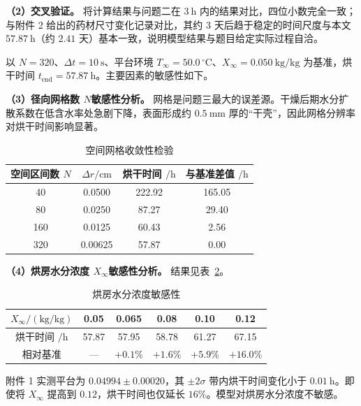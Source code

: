 \documentclass[12pt,a4paper]{article}
\begin{document}
\textbf{（2）交叉验证。} 将计算结果与问题二在 \(3\ \mathrm{h}\) 内的结果对比，四位小数完全一致；与附件 2 给出的药材尺寸变化记录对比，其约 \(3\) 天后趋于稳定的时间尺度与本文 \(57.87\ \mathrm{h}\)（约 \(2.41\) 天）基本一致，说明模型结果与题目给定实际过程自洽。


以 \(N=320\)、\(\Delta t=10\ \mathrm{s}\)、平台环境 \(T_\infty=50.0\,^\circ\mathrm{C}\)、\(X_\infty=0.050\ \mathrm{kg/kg}\) 为基准，烘干时间 \(t_{\mathrm{end}}=57.87\ \mathrm{h}\)。主要因素的敏感性如下。

\textbf{（3）径向网格数 \(N\)敏感性分析。} 网格是问题三最大的误差源。干燥后期水分扩散系数在低含水率处急剧下降，表面形成约 \(0.5\ \mathrm{mm}\) 厚的“干壳”，因此网格分辨率对烘干时间影响显著。
\begin{table}[htbp]
  \centering
  \caption{空间网格收敛性检验}
  \label{tab:grid3}
  \begin{tabular}{cccc}
    \hline
    空间区间数 \(N\) & \(\Delta r/\mathrm{cm}\) & 烘干时间 \(/\mathrm{h}\) & 与基准差值 \(/\mathrm{h}\) \\
    \hline
    40  & 0.0500  & 222.92 & 165.05 \\
    80  & 0.0250  & 87.27  & 29.40 \\
    160 & 0.0125  & 60.43  & 2.56 \\
    320 & 0.00625 & 57.87  & 0.00 \\
    \hline
  \end{tabular}
\end{table}


\textbf{（4）烘房水分浓度 \(X_\infty\)敏感性分析。} 结果见表~\ref{tab:xinf3}。

\begin{table}[htbp]
  \centering
  \caption{烘房水分浓度敏感性}
  \label{tab:xinf3}
  \begin{tabular}{cccccc}
    \hline
    \(X_\infty/(\mathrm{kg/kg})\) & 0.05 & 0.065 & 0.08 & 0.10 & 0.12 \\
    \hline
    烘干时间 \(/\mathrm{h}\) & 57.87 & 57.95 & 58.78 & 61.27 & 67.15 \\
    相对基准 & — & \(+0.1\%\) & \(+1.6\%\) & \(+5.9\%\) & \(+16.0\%\) \\
    \hline
  \end{tabular}
\end{table}

附件 1 实测平台为 \(0.04994\pm0.00020\)，其 \(\pm2\sigma\) 带内烘干时间变化小于 \(0.01\ \mathrm{h}\)。即使将 \(X_\infty\) 提高到 \(0.12\)，烘干时间也仅延长 \(16\%\)。模型对烘房水分浓度不敏感。
\end{document}
